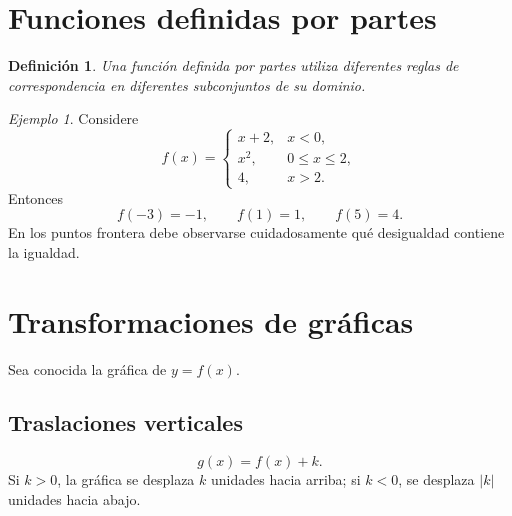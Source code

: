 \documentclass[12pt]{article}
\newtheorem{definicion}{Definición}[section]
\theoremstyle{remark}
\newtheorem{ejemplo}{Ejemplo}[section]
\begin{document}
\begin{center}
\end{center}

\section{Funciones definidas por partes}

\begin{definicion}
Una función definida por partes utiliza diferentes reglas de correspondencia en
diferentes subconjuntos de su dominio.
\end{definicion}

\begin{ejemplo}
Considere
\[
f(x)=
\begin{cases}
x+2,&x<0,\\
x^2,&0\leq x\leq2,\\
4,&x>2.
\end{cases}
\]
Entonces
\[
f(-3)=-1,\qquad f(1)=1,\qquad f(5)=4.
\]
En los puntos frontera debe observarse cuidadosamente qué desigualdad contiene
la igualdad.
\end{ejemplo}

\section{Transformaciones de gráficas}

Sea conocida la gráfica de $y=f(x)$.

\subsection{Traslaciones verticales}

\[
g(x)=f(x)+k.
\]
Si $k>0$, la gráfica se desplaza $k$ unidades hacia arriba; si $k<0$, se
desplaza $|k|$ unidades hacia abajo.
\end{document}
